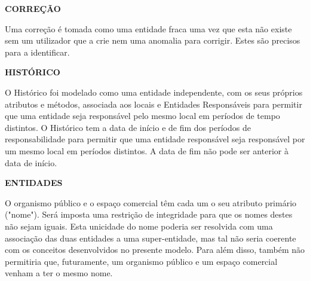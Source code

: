 \documentclass[10pt]{report}
\begin{document}
    \vspace*{10mm}
    \noindent\textbf{CORREÇÃO}

        
        Uma correção é tomada como uma entidade fraca uma vez que esta não existe sem um utilizador que a crie nem uma anomalia para corrigir. Estes são precisos para a identificar.
    

    \vspace*{10mm}
    \noindent\textbf{HISTÓRICO}

        
        O Histórico foi modelado como uma entidade independente, com os seus próprios atributos e métodos, associada aos locais e Entidades Responsáveis para permitir que uma entidade seja responsável pelo mesmo local em períodos de tempo distintos.
        O Histórico tem a data de início e de fim dos períodos de responsabilidade para permitir que uma entidade responsável seja responsável por um mesmo local em períodos distintos. A data de fim não pode ser anterior à data de início.
    

    \vspace*{10mm}
    \noindent\textbf{ENTIDADES}

        
        O organismo público e o espaço comercial têm cada um o seu atributo primário ("nome"). Será imposta uma restrição de integridade para que os 
        nomes destes não sejam iguais. Esta unicidade do nome poderia ser resolvida com uma associação das duas entidades a uma super-entidade, 
        mas tal não seria coerente com os conceitos desenvolvidos no presente modelo. Para além disso, também não permitiria que, 
        futuramente, um organismo público e um espaço comercial venham a ter o mesmo nome.
    
\end{document}
